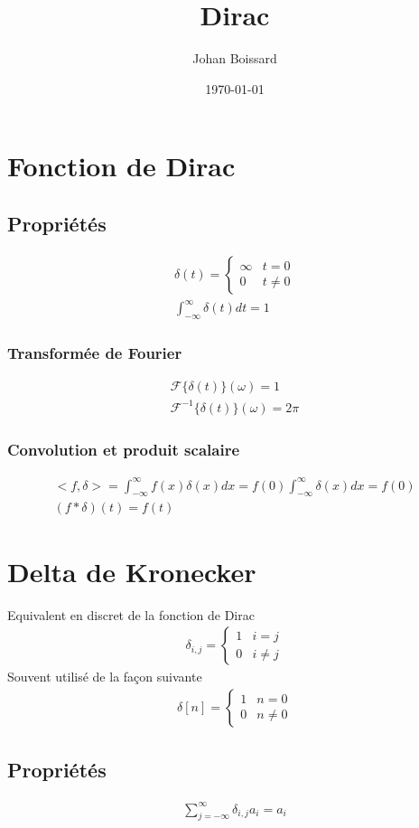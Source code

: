 \documentclass[a4paper]{article}
\title{Dirac}
\author{Johan Boissard}
\date\today
\begin{document}
\maketitle
\section{Fonction de Dirac}
\subsection{Propriétés}
\begin{eqnarray}
	\delta(t)=
	\begin{cases}
		\infty&t=0\\
		0&t\neq0
	\end{cases}
	\\
	\int_{-\infty}^{\infty}\delta(t)dt=1
\end{eqnarray}

\subsubsection{Transformée de Fourier}
\begin{eqnarray}
	\mathcal{F}\{\delta(t)\}(\omega)=1
	\\
	\mathcal{F}^{-1}\{\delta(t)\}(\omega)=2\pi
\end{eqnarray}

\subsubsection{Convolution et produit scalaire}
\begin{eqnarray}
	<f,\delta>=\int_{-\infty}^{\infty}f(x)\delta(x)dx=f(0)\int_{-\infty}^{\infty}\delta(x)dx= f(0)
	\\
	(f*\delta)(t)=f(t)
\end{eqnarray}
\section{Delta de Kronecker}
Equivalent en discret de la fonction de Dirac
\begin{eqnarray}
	\delta_{i,j}=
	\begin{cases}
		1&i=j\\
		0&i\neq j
	\end{cases}
\end{eqnarray}
Souvent utilisé de la façon suivante
\begin{eqnarray}
	\delta[n]=
	\begin{cases}
		1&n=0\\
		0&n\neq0
	\end{cases}
\end{eqnarray}
\subsection{Propriétés}
\begin{eqnarray}
	\sum_{j=-\infty}^{\infty}\delta_{i,j}a_i=a_i
\end{eqnarray}
\end{document}
